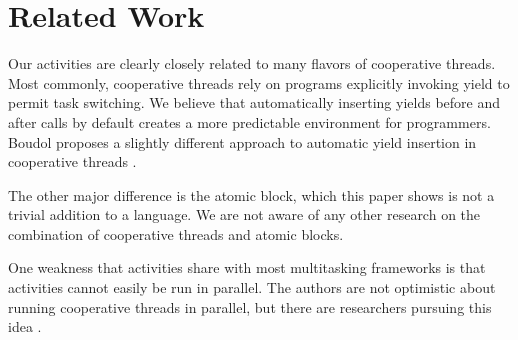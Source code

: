 \documentclass[acmsmall,anonymous,review]{acmart}\settopmatter{printfolios=true,printccs=false,printacmref=false}
\begin{document}



\section{Related Work}

Our activities are clearly closely related to many flavors of cooperative threads.
Most commonly, cooperative threads rely on programs explicitly invoking yield to permit task switching.
We believe that automatically inserting yields before and after calls by default creates a more predictable environment for programmers.
Boudol proposes a slightly different approach to automatic yield insertion in cooperative threads \cite{Boudol2007}.

The other major difference is the atomic block, which this paper shows is not a trivial addition to a language.
We are not aware of any other research on the combination of cooperative threads and atomic blocks.

One weakness that activities share with most multitasking frameworks is that activities cannot easily be run in parallel.
The authors are not optimistic about running cooperative threads in parallel, but there are researchers pursuing this idea \cite{ONeill2015, Boussinot2006, Dabrowski2006}.
\end{document}

